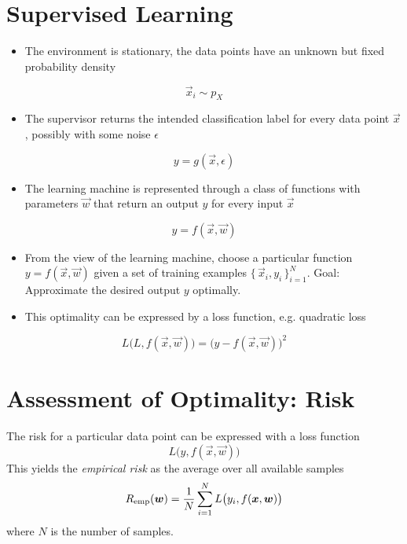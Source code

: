 	\section{Supervised Learning}
		\begin{itemize}
			\item The environment is stationary, the data points have an unknown but fixed probability density
		\end{itemize}
		\begin{equation}
			\vec{x}_i \sim p_X
		\end{equation}
		\begin{itemize}
			\item The supervisor returns the intended classification label for every data point \(\vec{x}\), possibly with some noise \( \epsilon \)
		\end{itemize}
		\begin{equation}
			y = g(\vec{x}, \epsilon)
		\end{equation}
		\begin{itemize}
			\item The learning machine is represented through a class of functions with parameters \(\vec{w}\) that return an output \(y\) for every input \(\vec{x}\)
		\end{itemize}
		\begin{equation}
			y = f(\vec{x}, \vec{w})
		\end{equation}
		
		\begin{itemize}
			\item From the view of the learning machine, choose a particular function \( y = f(\vec{x}, \vec{w}) \) given a set of training examples \( \{\, \vec{x}_i, y_i \,\}_{i = 1}^N \). Goal: Approximate the desired output \(y\) optimally.
			\item This optimality can be expressed by a loss function, e.g. quadratic loss
		\end{itemize}
		\begin{equation}
			L\big(L, f(\vec{x}, \vec{w})\big) = \big(y - f(\vec{x}, \vec{w})\big)^2
		\end{equation}

	\section{Assessment of Optimality: Risk}
		The risk for a particular data point can be expressed with a loss function
		\begin{equation}
			L\big(y, f(\vec{x}, \vec{w})\big)
		\end{equation}
		This yields the \emph{empirical risk} as the average over all available samples
		\begin{equation}
			R_{{\operatorname{emp}}}(\bm{w}) = \frac{1}{N} \sum_{i = 1}^{N} L\big(y_i, f(\bm{x}, \bm{w})\big)
		\end{equation}
		where \(N\) is the number of samples.
		
